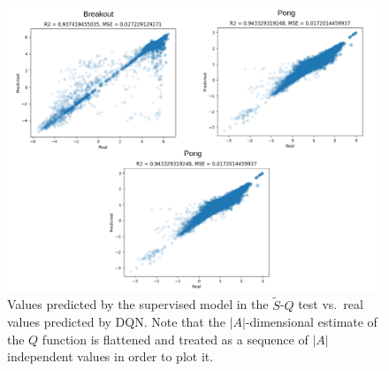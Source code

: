 \begin{figure}
    \includegraphics[width=\textwidth]{pictures/experiments/FQ_test_all_three}
    \centering
    \caption[Predictions of $\tilde{S}$-$Q$ mapping experiment]{Values predicted 
	     by the supervised model in the $\tilde{S}$-$Q$ test vs.\ real 
	     values predicted by DQN. Note that the $|A|$-dimensional estimate 
	     of the $Q$ function is flattened and treated as a sequence of 
	     $|A|$ independent values in order to plot it.}
    \label{f:FQ_test_all_three}
\end{figure}
%


